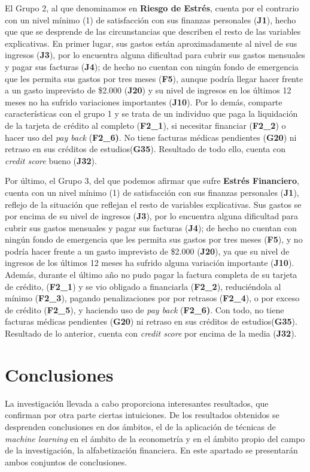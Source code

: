 \documentclass[a4paper, 11pt]{article}
\begin{document}
El Grupo 2, al que denominamos en \textbf{Riesgo de Estrés}, cuenta por el contrario con
un nivel mínimo (1) de satisfacción con sus finanzas personales (\textbf{J1}), hecho que 
que se desprende de las circunstancias que describen el resto de las variables explicativas.
En primer lugar, sus gastos están aproximadamente al nivel de sus ingresos (\textbf{J3}),
por lo encuentra alguna dificultad para cubrir sus gastos mensuales y pagar sus facturas
(\textbf{J4}); de hecho no cuentan con ningún fondo de emergencia que les permita 
sus gastos por tres meses (\textbf{F5}), aunque podría llegar hacer frente a un gasto 
imprevisto de \$2.000 (\textbf{J20}) y su nivel de ingresos en los últimos 12 meses no 
ha sufrido variaciones importantes (\textbf{J10}). Por lo demás, comparte características
con el grupo 1 y se trata de un individuo que paga la liquidación de la tarjeta de crédito
al completo (\textbf{F2\_1}), si necesitar financiar (\textbf{F2\_2}) o hacer uso del
\textit{pay back} (\textbf{F2\_6)}. No tiene facturas médicas pendientes (\textbf{G20}) 
ni retraso en sus créditos de estudios(\textbf{G35}). Resultado de todo ello, cuenta con
\textit{credit score} bueno (\textbf{J32}). 

Por último, el Grupo 3, del que podemos afirmar que sufre \textbf{Estrés Financiero}, 
cuenta con un nivel mínimo (1) de satisfacción con sus finanzas personales (\textbf{J1}),
reflejo de la situación que reflejan el resto de variables explicativas. Sus gastos se 
por encima de su nivel de ingresos (\textbf{J3}), por lo encuentra alguna dificultad para
cubrir sus gastos mensuales y pagar sus facturas (\textbf{J4}); de hecho no cuentan con ningún
fondo de emergencia que les permita sus gastos por tres meses (\textbf{F5}), y no podría 
hacer frente a un gasto imprevisto de \$2.000 (\textbf{J20}), ya que su nivel de ingresos 
de los últimos 12 meses ha sufrido alguna variación importante (\textbf{J10}). 
Además, durante el último año no pudo pagar la factura completa de su tarjeta de crédito,
(\textbf{F2\_1}) y se vio obligado a financiarla (\textbf{F2\_2}), reduciéndola al mínimo
(\textbf{F2\_3}), pagando penalizaciones por por retrasos (\textbf{F2\_4}), o por exceso de
crédito (\textbf{F2\_5}), y haciendo uso de \textit{pay back} (\textbf{F2\_6)}.
Con todo, no tiene facturas médicas pendientes (\textbf{G20}) ni retraso en sus créditos de
estudios(\textbf{G35}). Resultado de lo anterior, cuenta con \textit{credit score} 
por encima de la media (\textbf{J32}). 

\section{Conclusiones}
\label{sec:conclusions}
La investigación llevada a cabo proporciona interesantes resultados, que confirman por 
otra parte ciertas intuiciones. De los resultados obtenidos se desprenden conclusiones en
dos ámbitos, el de la aplicación de técnicas de \textit{machine learning} en el ámbito de la econometría y en el ámbito propio del campo de la investigación, la alfabetización
financiera. En este apartado se presentarán ambos conjuntos de conclusiones.
\end{document}
